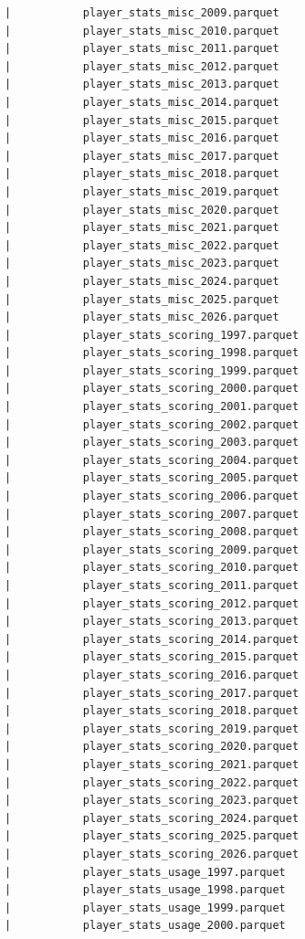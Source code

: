 \begin{lstlisting}
      |           player_stats_misc_2009.parquet
      |           player_stats_misc_2010.parquet
      |           player_stats_misc_2011.parquet
      |           player_stats_misc_2012.parquet
      |           player_stats_misc_2013.parquet
      |           player_stats_misc_2014.parquet
      |           player_stats_misc_2015.parquet
      |           player_stats_misc_2016.parquet
      |           player_stats_misc_2017.parquet
      |           player_stats_misc_2018.parquet
      |           player_stats_misc_2019.parquet
      |           player_stats_misc_2020.parquet
      |           player_stats_misc_2021.parquet
      |           player_stats_misc_2022.parquet
      |           player_stats_misc_2023.parquet
      |           player_stats_misc_2024.parquet
      |           player_stats_misc_2025.parquet
      |           player_stats_misc_2026.parquet
      |           player_stats_scoring_1997.parquet
      |           player_stats_scoring_1998.parquet
      |           player_stats_scoring_1999.parquet
      |           player_stats_scoring_2000.parquet
      |           player_stats_scoring_2001.parquet
      |           player_stats_scoring_2002.parquet
      |           player_stats_scoring_2003.parquet
      |           player_stats_scoring_2004.parquet
      |           player_stats_scoring_2005.parquet
      |           player_stats_scoring_2006.parquet
      |           player_stats_scoring_2007.parquet
      |           player_stats_scoring_2008.parquet
      |           player_stats_scoring_2009.parquet
      |           player_stats_scoring_2010.parquet
      |           player_stats_scoring_2011.parquet
      |           player_stats_scoring_2012.parquet
      |           player_stats_scoring_2013.parquet
      |           player_stats_scoring_2014.parquet
      |           player_stats_scoring_2015.parquet
      |           player_stats_scoring_2016.parquet
      |           player_stats_scoring_2017.parquet
      |           player_stats_scoring_2018.parquet
      |           player_stats_scoring_2019.parquet
      |           player_stats_scoring_2020.parquet
      |           player_stats_scoring_2021.parquet
      |           player_stats_scoring_2022.parquet
      |           player_stats_scoring_2023.parquet
      |           player_stats_scoring_2024.parquet
      |           player_stats_scoring_2025.parquet
      |           player_stats_scoring_2026.parquet
      |           player_stats_usage_1997.parquet
      |           player_stats_usage_1998.parquet
      |           player_stats_usage_1999.parquet
      |           player_stats_usage_2000.parquet

\end{lstlisting}
